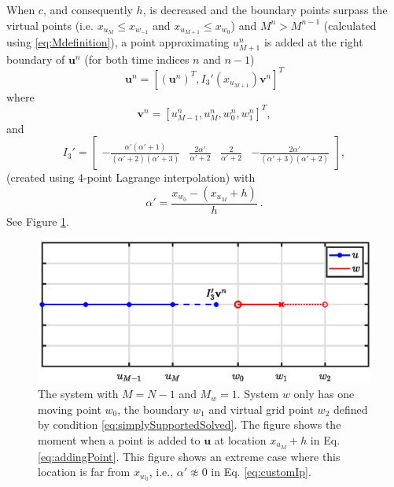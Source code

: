 \documentclass[dvipsnames, reprint]{JASA}
\def\SWcomment[#1]{\textcolor{Bittersweet}{#1}}
\begin{document}
When $c$, and consequently $h$, is decreased and the boundary points surpass the virtual points (i.e. $x_{u_M} \leq x_{w_{-1}}$ and $x_{u_{M+1}} \leq x_{w_0}$) and $M^n > M^{n-1}$ (calculated using \eqref{eq:Mdefinition}), a point approximating $u_{M+1}^n$ is added at the right boundary of $\mathbf{u}^n$ (for both time indices $n$ and $n-1$)
\begin{equation}\label{eq:addingPoint}
       \mathbf{u}^n = [(\mathbf{u}^n)^T, I_3'(x_{u_{M+1}})\mathbf{v}^n]^T
\end{equation}
where
\begin{equation*}
\mathbf{v}^n = [u_{M-1}^n, u_M^n, w_0^n, w_1^n]^T, 
\end{equation*}
and
\begin{equation}\label{eq:customIp}
    I_3' = \begin{bmatrix} -\frac{\alpha'(\alpha'+1)}{(\alpha'+2)(\alpha'+3)} &\frac{2\alpha'}{\alpha'+2} &\frac{2}{\alpha'+2} 
    &-\frac{2\alpha'}{(\alpha'+3)(\alpha'+2)}
    \end{bmatrix},
\end{equation}
\SWcomment[(created using 4-point Lagrange interpolation)] with
\begin{equation}
    \alpha' = \frac{x_{w_0} - (x_{u_M} + h)}{h}\ .\nonumber
\end{equation}
See Figure \ref{fig:addingPoint}.

\begin{figure}[ht]
\includegraphics[width=\reprintcolumnwidth]{addingGridPoint2}
\caption{\label{fig:addingPoint}{The system with $M = N-1$ and $M_w = 1$. System $w$ only has one moving point $w_0$, the boundary $w_1$ and virtual grid point $w_2$ defined by condition \eqref{eq:simplySupportedSolved}. The figure shows the moment when a point is added to $\mathbf{u}$ at location $x_{u_M} + h$ in Eq. \eqref{eq:addingPoint}. This figure shows an extreme case where this location is far from $x_{w_0}$, i.e., $\alpha' \not\approx 0$ in Eq. \eqref{eq:customIp}.}}
\end{figure} 
\end{document}
